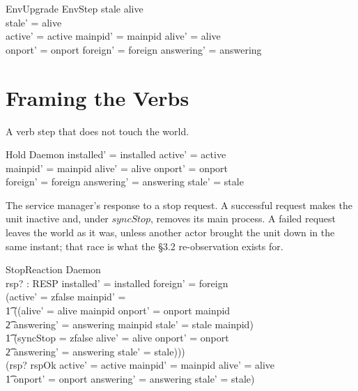 \documentclass[a4paper,10pt,fleqn]{article}
\begin{document}
\begin{schema}{EnvUpgrade}
  EnvStep
\where
  stale \neq alive \\
  stale' = alive \\
  active' = active \land mainpid' = mainpid \land alive' = alive \\
  onport' = onport \land foreign' = foreign \land answering' = answering
\end{schema}

\section{Framing the Verbs}

A verb step that does not touch the world.

\begin{schema}{Hold}
  \Delta Daemon
\where
  installed' = installed \land active' = active \\
  mainpid' = mainpid \land alive' = alive \land onport' = onport \\
  foreign' = foreign \land answering' = answering \land stale' = stale
\end{schema}

The service manager's response to a stop request. A successful request makes
the unit inactive and, under $syncStop$, removes its main process. A failed
request leaves the world as it was, unless another actor brought the unit down
in the same instant; that race is what the \S3.2 re-observation exists for.

\begin{schema}{StopReaction}
  \Delta Daemon \\
  rsp? : RESP
\where
  installed' = installed \land foreign' = foreign \\
  (active' = zfalse \land mainpid' = \emptyset \land \\
  \t1 ((alive' = alive \setminus mainpid \land
    onport' = onport \setminus mainpid \land \\
  \t2 answering' = answering \setminus mainpid \land
    stale' = stale \setminus mainpid) \lor \\
  \t1 (syncStop = zfalse \land alive' = alive \land onport' = onport \land \\
  \t2 answering' = answering \land stale' = stale))) \lor \\
  (rsp? \neq rspOk \land active' = active \land mainpid' = mainpid \land
    alive' = alive \land \\
  \t1 onport' = onport \land answering' = answering \land stale' = stale)
\end{schema}
\end{document}
